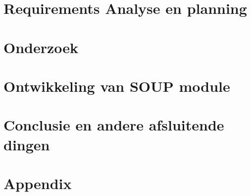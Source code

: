 \part{Requirements Analyse en planning}\label{prt:Requirements}




\ctparttext{}
\part{Onderzoek}\label{prt:Onderzoek} %







 \ctparttext{}
 \part{Ontwikkeling van SOUP module}\label{prt:Impolementatie}
 
 
 
 
 
 
 

 \ctparttext{}

 \part{Conclusie en andere afsluitende dingen}\label{prt:Conclussie}
 
 

\cleardoublepage %


\ctparttext{}


\cleardoublepage %


\appendix

\part{Appendix}\label{prt:Appendix} %

